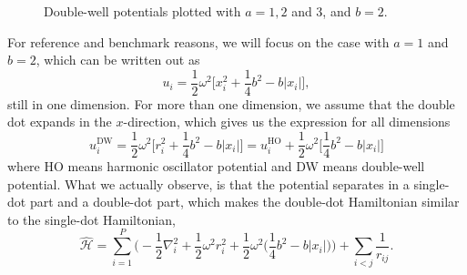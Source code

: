 \begin{figure}
	\centering
	
	\caption{Double-well potentials plotted with $a=1,2$ and 3, and $b=2$.}
	\label{fig:doublewell}
\end{figure}

For reference and benchmark reasons, we will focus on the case with $a=1$ and $b=2$, which can be written out as
\begin{equation}
u_i=\frac{1}{2}\omega^2\bigg[x_i^2+\frac{1}{4}b^2-b|x_i|\bigg],
\label{eq:doublewell2}
\end{equation}
still in one dimension. For more than one dimension, we assume that the double dot expands in the $x$-direction, which gives us the expression for all dimensions
\begin{equation}
u_i^{\text{DW}}=\frac{1}{2}\omega^2\bigg[r_i^2+\frac{1}{4}b^2-b|x_i|\bigg]=u_i^{\text{HO}}+\frac{1}{2}\omega^2\bigg[\frac{1}{4}b^2-b|x_i|\bigg]
\label{eq:doublewell3}
\end{equation}
where HO means harmonic oscillator potential and DW means double-well potential. What we actually observe, is that the potential separates in a single-dot part and a double-dot part, which makes the double-dot Hamiltonian similar to the single-dot Hamiltonian,
\begin{equation}
\label{eq:DWHamiltonian}
\hat{\mathcal{H}} = \sum_{i=1}^{P} \bigg(-\frac{1}{2} \nabla_i^2 + \frac{1}{2} \omega^2r_i ^2 + \frac{1}{2} \omega^2\Big(\frac{1}{4}b^2-b|x_i|\Big)\bigg) + \sum_{i<j} \frac{1}{r_{ij}}.
\end{equation}


